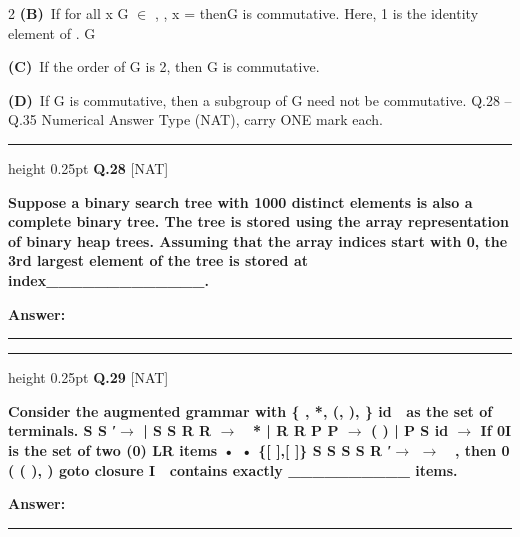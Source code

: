 \documentclass[a4paper,10pt,twoside]{article}
\begin{document}
\begin{multicols}{2}
\textbf{(B)}~If for all x \newline G \newline $\in$ \newline ,  , \newline x = \newline thenG is commutative. Here, 1 is the identity element of \newline . \newline G\par\vspace{2pt}\noindent
\textbf{(C)}~If the order of G is 2, then G is commutative.\par\vspace{2pt}\noindent
\textbf{(D)}~If G is commutative, then a subgroup of G need not be commutative. \newline Q.28 -- Q.35 Numerical Answer Type (NAT), carry ONE mark each.
\par\vspace{6pt}\hrule height 0.25pt\vspace{6pt}
\noindent\textbf{Q.28} \hfill {\footnotesize\textsf{[NAT]}}
\par\vspace{2pt}
{\bfseries Suppose a binary search tree with 1000 distinct elements is also a complete binary
tree. The tree is stored using the array representation of binary heap trees. Assuming
that the array indices start with 0, the 3rd largest element of the tree is stored at
index\_\_\_\_\_\_\_\_\_\_\_\_\_. \par}
\par\vspace{3pt}\noindent\textbf{Answer:} \rule{3.2cm}{0.4pt}
\par\vspace{6pt}\hrule height 0.25pt\vspace{6pt}
\noindent\textbf{Q.29} \hfill {\footnotesize\textsf{[NAT]}}
\par\vspace{2pt}
{\bfseries Consider the augmented grammar with \{ , *, (, ),
\}
id

as the set of terminals.
S
S
′$\to$
|
S
S
R R
$\to$

*
|
R
R
P P
$\to$
( ) |
P
S
id
$\to$
If
0I is the set of two
(0)
LR
items
•
•
\{[
],[
]\}
S
S
S
S
R
′$\to$
$\to$

, then
0
(
( ), )
goto closure I
 contains exactly \_\_\_\_\_\_\_\_\_\_ items. \par}
\par\vspace{3pt}\noindent\textbf{Answer:} \rule{3.2cm}{0.4pt}

\end{multicols}
\end{document}
